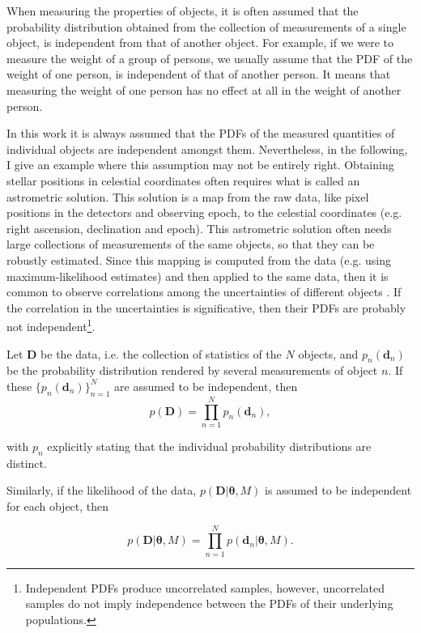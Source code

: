 When measuring the properties of objects, it is often assumed that the probability distribution obtained from the collection of measurements of a single object, is independent from that of another object. For example, if we were to measure the weight of a group of persons, we usually assume that the PDF of the weight of one person, is independent of that of another person. It means that measuring the weight of one person has no effect at all in the weight of another person.


In this work it is always assumed that the PDFs of the measured quantities of individual objects are independent amongst them. Nevertheless, in the following, I give an example where this assumption may not be entirely right. Obtaining stellar positions in celestial coordinates often requires what is called an astrometric solution. This solution is a map from the raw data, like pixel positions in the detectors and observing epoch, to the celestial coordinates (e.g. right ascension, declination and epoch). This astrometric solution often needs large collections of measurements of the same objects, so that they can be robustly estimated. Since this mapping is computed from the data (e.g. using maximum-likelihood estimates) and then applied to the same data, then it is common to observe correlations among the uncertainties of different objects \cite[see for example][]{2010IAUS..261..320H,2017A&A...601A..19G}. If the correlation in the uncertainties is significative, then their PDFs are probably not independent\footnote{Independent PDFs produce uncorrelated samples, however, uncorrelated samples do not imply independence between the PDFs of their underlying populations.}.  


Let $\mathbf{D}$ be the data, i.e. the collection of statistics of the $N$ objects, and $p_n(\mathbf{d}_n)$ be the probability distribution rendered by several measurements of object $n$. If these $\{p_n(\mathbf{d}_n)\}_{n=1}^N$ are assumed to be independent, then
\begin{equation}
\label{eq:independence}
 p(\mathbf{D}) = \prod_{n=1}^N p_n(\mathbf{d}_n),
\end{equation}

 with $p_n$ explicitly stating that the individual probability distributions are distinct. 
 
Similarly, if the likelihood of the data, $p(\mathbf{D}|\boldsymbol{\theta},M)$ is assumed to be independent for each object, then

\begin{equation}
\label{eq:lik_datum}
 p(\mathbf{D}|\boldsymbol{\theta},M) = \prod_{n=1}^N p(\mathbf{d}_n|\boldsymbol{\theta},M).
\end{equation}

